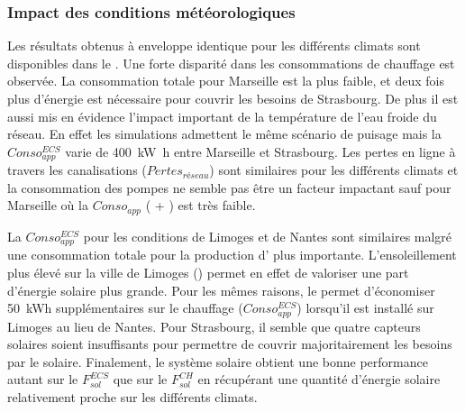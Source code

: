 \subsubsection{Impact des conditions météorologiques} %
\label{ssub:impact_des_conditions_meteorologiques}
Les résultats obtenus à enveloppe identique pour les différents climats sont disponibles dans
le . Une forte disparité dans les consommations
de chauffage est observée. La consommation totale pour Marseille est la plus faible, et deux fois
plus d’énergie est nécessaire pour couvrir les besoins de Strasbourg. De plus il est aussi
mis en évidence l’impact important de la température de l’eau froide du réseau. En effet
les simulations admettent le même scénario de puisage mais la $Conso_{app}^{ECS}$ varie de
\SI{400}{\kilo\watt\hour} entre Marseille et Strasbourg. Les pertes en ligne à travers
les canalisations ($Pertes_{réseau}$) sont similaires pour les différents climats et la
consommation des pompes ne semble pas être un facteur impactant sauf pour Marseille où la
$Conso_{app}$  ( + ) est très faible.

La $Conso_{app}^{ECS}$ pour les conditions de Limoges et de Nantes sont similaires malgré
une consommation totale pour la production d’ plus importante. L’ensoleillement
plus élevé sur la ville de Limoges () permet en effet de
valoriser une part d’énergie solaire plus grande. Pour les mêmes raisons, le 
permet d’économiser \SI{50}{kWh} supplémentaires sur le chauffage ($Conso_{app}^{ECS}$) lorsqu’il
est installé sur Limoges au lieu de Nantes. Pour Strasbourg, il semble que quatre capteurs
solaires soient insuffisants pour permettre de couvrir majoritairement les besoins par le
solaire. Finalement, le système solaire obtient une bonne performance autant sur le
$F_{sol}^{ECS}$ que sur le $F_{sol}^{CH}$ en récupérant une quantité d’énergie solaire
relativement proche sur les différents climats.

